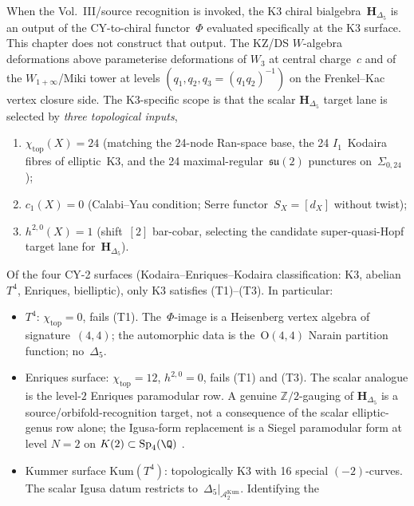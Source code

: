 \begin{remark}
\label{rem:wac-W15-1-scope}
When the Vol.~III/source recognition is invoked, the K3 chiral
bialgebra~$\mathbf{H}_{\Delta_5}$ is an output of the CY-to-chiral
functor~$\Phi$ evaluated specifically at the K3 surface. This chapter
does not construct that output. The KZ/DS $W$-algebra deformations above
parameterise
deformations of $W_3$ at central charge~$c$ and of the
$W_{1+\infty}$/Miki tower at levels $(q_1,q_2,q_3 = (q_1 q_2)^{-1})$
on the Frenkel--Kac vertex closure side. The K3-specific scope is
that the scalar $\mathbf{H}_{\Delta_5}$ target lane is selected by
\emph{three topological inputs},
\begin{enumerate}[label=\textup{(T\arabic*)},leftmargin=2em,
 topsep=0.3ex,itemsep=0.3ex]
\item $\chi_{\mathrm{top}}(X) = 24$ (matching the 24-node Ran-space
 base, the 24 $I_1$~Kodaira fibres of elliptic~K3, and the 24
 maximal-regular~$\mathfrak{su}(2)$ punctures on~$\Sigma_{0,24}$);
\item $c_1(X) = 0$ (Calabi--Yau condition; Serre functor~$S_X = [d_X]$
 without twist);
\item $h^{2,0}(X) = 1$ (shift~$[2]$ bar-cobar, selecting the candidate
 super-quasi-Hopf target lane for~$\mathbf{H}_{\Delta_5}$).
\end{enumerate}
Of the four CY-2 surfaces (Kodaira--Enriques--Kodaira classification:
K3, abelian $T^4$, Enriques, bielliptic), only K3 satisfies
(T1)--(T3). In particular:
\begin{itemize}
\item $T^4$: $\chi_{\mathrm{top}} = 0$, fails (T1). The~$\Phi$-image
 is a Heisenberg vertex algebra of signature~$(4,4)$; the automorphic
 data is the~$\mathrm{O}(4,4)$ Narain partition function; no~$\Delta_5$.
\item Enriques surface: $\chi_{\mathrm{top}} = 12$, $h^{2,0} = 0$,
 fails (T1) and (T3). The scalar analogue is the level-$2$ Enriques
 paramodular row. A genuine \(\mathbb Z/2\)-gauging of
 \(\mathbf{H}_{\Delta_5}\) is a source/orbifold-recognition target, not a
 consequence of the scalar elliptic-genus row alone; the Igusa-form
 replacement is a Siegel paramodular form at level $N = 2$
 on $K(2)\subset\mathrm{Sp}_4(\Q)$
 \cite{OguisoSakai2001,DolgachevKondo2002}.
\item Kummer surface $\mathrm{Kum}(T^4)$: topologically K3 with 16
 special $(-2)$-curves. The scalar Igusa datum restricts
 to~$\Delta_5|_{\mathcal{A}_2^{\mathrm{Kum}}}$. Identifying the

\end{itemize}
\end{remark}
